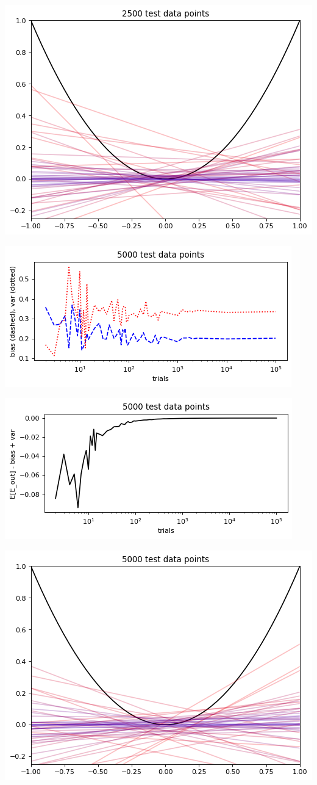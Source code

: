\documentclass[12pt]{article}
\begin{document}
        \begin{center}\includegraphics[width=0.68\linewidth]{png/2500_test_data_points.png}\end{center}

\pagebreak        
{}
\pagebreak
        \begin{center}\includegraphics[width=0.7\linewidth]{png/5000_data_points_bias-var.png}\end{center}
        \begin{center}\includegraphics[width=0.7\linewidth]{png/5000_data_points_diff.png}\end{center}
        \begin{center}\includegraphics[width=0.68\linewidth]{png/5000_test_data_points.png}\end{center}
\end{document}
